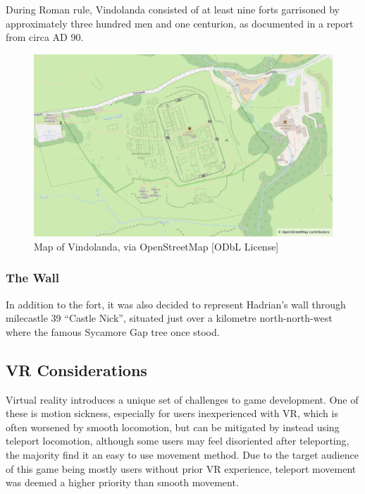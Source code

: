 \documentclass[sigconf,authordraft]{acmart}
\begin{document}
During Roman rule, Vindolanda consisted of at least nine forts
\cite{birley_vindolanda_2009} garrisoned by approximately three hundred men and
one centurion, as documented in a report from circa AD 90.
\cite{bowman_military_1991}

\begin{figure}[h]
  \includegraphics[width=\linewidth]{osm-vindolandra.png}
  \caption{Map of Vindolanda, via OpenStreetMap [ODbL License]}
\end{figure}

\subsubsection{The Wall}

In addition to the fort, it was also decided to represent Hadrian's wall through
milecastle 39 ``Castle Nick'', situated just over a kilometre north-north-west
where the famous Sycamore Gap tree once stood.

\subsection{VR Considerations}
Virtual reality introduces a unique set of challenges to game development. One
of these is motion sickness, especially for users inexperienced with VR,
\cite{chattha_motion_2020} which is often worsened by smooth locomotion, but can
be mitigated by instead using teleport locomotion, although some users may feel
disoriented after teleporting, the majority find it an easy to use movement
method. \cite{bozgeyikli_point_2016} Due to the target audience of this game
being mostly users without prior VR experience, teleport movement was deemed a
higher priority than smooth movement.
\end{document}
